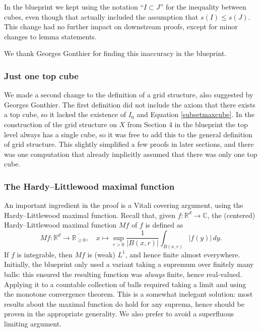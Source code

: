 \documentclass[12pt]{amsart}
\newcommand*{\complex}{\mathbb{C}} %
\newcommand*{\real}{\mathbb{R}} %
\newcommand{\ennreal}{\overline{\real_{\ge0}}}
\theoremstyle{definition}
\theoremstyle{plain}
\begin{document}
In the blueprint we kept using the notation ``$I \subset J$'' for the inequality between cubes,
even though that actually included the assumption that $s(I) \le s(J)$. %
This change had no further impact on downstream proofs, except for minor changes to lemma statements.

We thank Georges Gonthier for finding this inaccuracy in the blueprint.

\subsubsection{Just one top cube}

We made a second change to the definition of a grid structure, also suggested by Georges Gonthier.
The first definition did not include the axiom that there exists a top cube,
so it lacked the existence of $I_0$ and Equation \eqref{subsetmaxcube}.
In the construction of the grid structure on $X$
from Section 4 in the blueprint
the top level always has a single cube,
so it was free to add this to the general definition of grid structure.
This slightly simplified a few proofs in later sections,
and there was one computation that already implicitly assumed
that there was only one top cube.

\subsubsection{The Hardy--Littlewood maximal function} An important ingredient in the proof is a Vitali covering argument, using the Hardy--Littlewood maximal function.
Recall that, given $f\colon\real^d\to\complex$, the (centered) Hardy–Littlewood maximal function $M f$ of $f$ is defined as
\begin{equation*}
Mf\colon\real^d \to\ennreal, \quad x\mapsto \sup_{r>0}\frac{1}{|B(x,r)|}\int_{B(x,r)}|f(y)|\,dy.
\end{equation*}
If $f$ is integrable, then $M f$ is (weak) $L^1$, and hence finite almost everywhere. Initially, the blueprint only used a variant taking a supremum over finitely many balls: this ensured the resulting function was \emph{always} finite, hence real-valued. Applying it to a countable collection of balls required taking a limit and using the monotone convergence theorem.
This is a somewhat inelegant solution: most results about the maximal function do hold for any suprema, hence should be proven in the appropriate generality. We also prefer to avoid a superfluous limiting argument.
\end{document}
